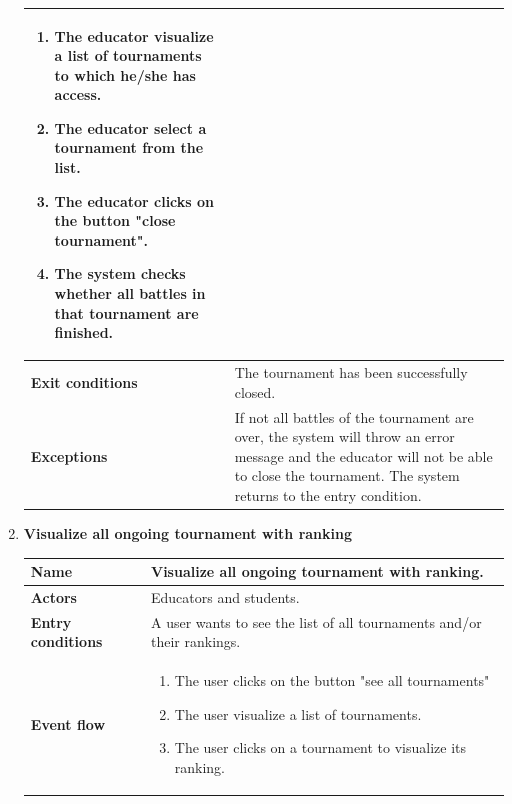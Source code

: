 \begin{enumerate}[label=\textbf{UC.\arabic*}]
\begin{table}[H]
\begin{tabular}{|m{3.2cm}|m{9.8cm}|}
\begin{enumerate}[label=\arabic*.]
                        \item The educator visualize a list of tournaments to which he/she has access.
                        \item The educator select a tournament from the list.
                        \item The educator clicks on the button "close tournament".
                        \item The system checks whether all battles in that tournament are finished.
                    \end{enumerate}\\
                    \hline
                    \textbf{Exit conditions}  & The tournament has been successfully closed. \\
                    \hline
                    \textbf{Exceptions}  & If not all battles of the tournament are over, the system will throw an error message and the educator will not be able to close the tournament. The system returns to the entry condition.\\
                    \hline 
                \end{tabular}
        \end{table}
        \item {} \textbf{Visualize all ongoing tournament with ranking}
        \begin{table}[H]
    	    \centering
                \renewcommand{\arraystretch}{1.5}
                \begin{tabular}{|m{3.2cm}|m{9.8cm}|}
                    \hline
                    \textbf{Name} & Visualize all ongoing tournament with ranking.  \\
                    \hline
                    \textbf{Actors} & Educators and students. \\
                    \hline
                    \textbf{Entry conditions}  & A user wants to see the list of all tournaments and/or their rankings. \\
                    \hline
                    \textbf{Event flow}  & 
                    \begin{enumerate}[label=\arabic*.]
                        \item The user clicks on the button "see all tournaments"
                        \item The user visualize a list of tournaments.
                        \item The user clicks on a tournament to visualize its ranking.

\end{enumerate}
\end{tabular}
\end{table}
\end{enumerate}
